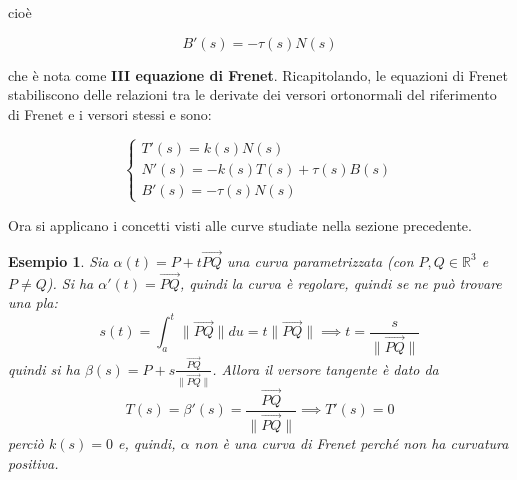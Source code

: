 \documentclass[12pt]{article}
\theoremstyle{style}
\newtheorem{esempio}{Esempio}[section]
\newenvironment{boxenv}[1][]{
    \begin{eqbox}[#1]
    }{
   \end{eqbox}
}
\numberwithin{equation}{subsection}
\renewcommand{\textbf}[1]{\textsf{\bfseries #1}}
\begin{document}
cio\`e
\begin{boxenv}[]
\begin{equation}
	B'(s) = - \tau (s) N(s)
\end{equation}
\end{boxenv}
\noindent che \`e nota come \textbf{III equazione di Frenet}.
Ricapitolando, le equazioni di Frenet stabiliscono delle relazioni tra le derivate dei versori ortonormali del riferimento di Frenet e i versori stessi e sono:
\begin{boxenv}[]
\begin{equation}
	\begin{cases}
		T'(s) = k(s) N(s)\\
		N'(s) = - k(s) T(s) + \tau (s) B(s)\\
		B'(s)=-\tau (s) N(s)
	\end{cases}
\end{equation}
\end{boxenv}
\noindent Ora si applicano i concetti visti alle curve studiate nella sezione precedente.
\begin{esempio}
	Sia $\alpha (t) = P + t \overrightarrow{PQ}$ una curva parametrizzata (con $P,Q \in \mathbb{R}^3$ e $P\neq Q$). 
	Si ha $\alpha '(t) = \overrightarrow{PQ}$, quindi la curva \`e regolare, quindi se ne pu\`o trovare una pla:
	\[
		s(t) = \int_{a} ^t \lVert \overrightarrow{PQ} \rVert du= t \lVert \overrightarrow{PQ} \rVert \implies t = \frac{s}{\lVert \overrightarrow{PQ} \rVert }
	\] 
	quindi si ha $\beta (s) = P + s \frac{\overrightarrow{PQ}}{\lVert \overrightarrow{PQ} \rVert }$. 
	Allora il versore tangente \`e dato da 
	\[
	T(s) = \beta '(s) = \frac{\overrightarrow{PQ}}{\lVert \overrightarrow{PQ} \rVert } \implies T'(s) = 0 
	\] 
	perci\`o $k(s) = 0$ e, quindi, $\alpha $ non \`e una curva di Frenet perch\'e non ha curvatura positiva.
\end{esempio}
\end{document}
